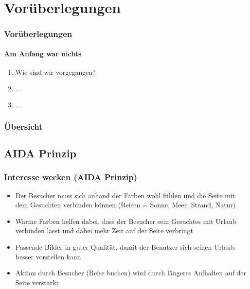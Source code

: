 \documentclass[xcolor=dvipsnames]{beamer}
\begin{document}
\section{Vorüberlegungen}
\begin{frame} %
  \frametitle{Vorüberlegungen} %
  \framesubtitle{Am Anfang war nichts} %
  \begin{block}{}
	  \begin{enumerate}
	  	\item Wie sind wir vorgegangen?
	  	\item ...
	  	\item ...
	  \end{enumerate}
  \end{block}
\end{frame}

\begin{frame}[shrink] %
  \frametitle{Übersicht} %
\end{frame}



\subsection{AIDA Prinzip}
\begin{frame} %
  \frametitle{Interesse wecken (AIDA Prinzip)} %
  \begin{block}{}
	\begin{itemize}
		\item Der Besucher muss sich anhand der Farben wohl fühlen und die Seite mit dem Gesuchten verbinden können (Reisen = Sonne, Meer, Strand, Natur)
		\item Warme Farben helfen dabei, dass der Besucher sein Gesuchtes mit Urlaub verbinden lässt und dabei mehr Zeit auf der Seite verbringt
		\item Passende Bilder in guter Qualität, damit der Benutzer sich seinen Urlaub besser vorstellen kann
		\item Aktion durch Besucher (Reise buchen) wird durch längeres Aufhalten auf der Seite verstärkt
	\end{itemize}
  \end{block}
\end{frame}
\end{document}
